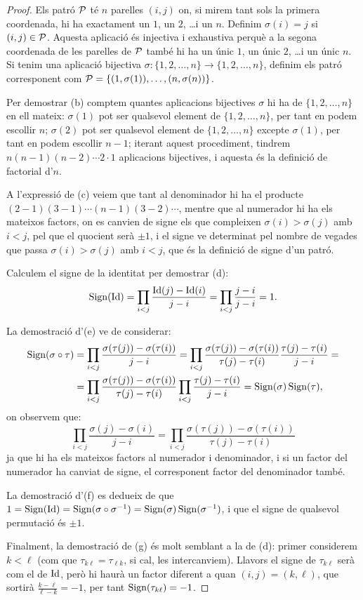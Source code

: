 \documentclass[
  11pt,
]{book}
\numberwithin{dummy}{section}
\theoremstyle{maincolornumbox}
\theoremstyle{blacknumex}
\theoremstyle{blacknumbox}
\theoremstyle{maincolornum}
\newlength\esp
\begin{document}
\begin{proof}
Els patró \(\mathcal{P}\) té \(n\) parelles \((i,j)\) on, si mirem tant
sols la primera coordenada, hi ha exactament un \(1\), un \(2\), \ldots i un
\(n\). Definim \(\sigma(i)=j\) si \((i,j)\in\mathcal{P}\). Aquesta aplicació és
injectiva i exhaustiva perquè a la segona coordenada de les parelles de
\(\mathcal{P}\) també hi ha un únic \(1\), un únic \(2\), \ldots i un únic \(n\).\\
Si tenim una aplicació bijectiva
\(\sigma\colon \{1,2,\dots,n\} \to \{1,2,\dots,n\}\), definim els patró
corresponent com \(\mathcal{P}=\{(1,\sigma(1)), \ldots, (n,\sigma(n))\}\).

Per demostrar (b) comptem quantes aplicacions bijectives \(\sigma\) hi ha
de \(\{1,2,\dots, n\}\) en ell mateix: \(\sigma(1)\) pot ser qualsevol
element de \(\{1,2,\dots, n\}\), per tant en podem escollir \(n\);
\(\sigma(2)\) pot ser qualsevol element de \(\{1,2,\dots, n\}\) excepte
\(\sigma(1)\), per tant en podem escollir \(n-1\); iterant aquest
procediment, tindrem \(n(n-1)(n-2) \cdots 2\cdot 1\) aplicacions
bijectives, i aquesta és la definició de factorial d'\(n\).

A l'expressió de (c) veiem que tant al denominador hi ha el producte
\((2-1)(3-1)\cdots (n-1)(3-2) \cdots\), mentre que al numerador hi ha els
mateixos factors, on es canvien de signe els que compleixen
\(\sigma(i)>\sigma(j)\) amb \(i<j\), pel que el quocient serà \(\pm 1\), i el
signe ve determinat pel nombre de vegades que passa
\(\sigma(i)>\sigma(j)\) amb \(i<j\), que és la definició de signe d'un
patró.

Calculem el signe de la identitat per demostrar (d):
\[\operatorname{Sign}(\operatorname{Id})=\prod_{i<j} \frac{\operatorname{Id}(j)-\operatorname{Id}(i)}{j-i}=\prod_{i<j} \frac{j-i}{j-i}=1 .\]

La demostració d'(e) ve de considerar: \begin{align*}
    \operatorname{Sign}(\sigma\circ\tau) & =\prod_{i<j} \frac{\sigma(\tau(j))-\sigma(\tau(i))}{j-i}  =
    \prod_{i<j} \frac{\sigma(\tau(j))-\sigma(\tau(i))}{\tau(j)-\tau(i)}\frac{\tau(j)-\tau(i)}{j-i}=\\
     & =\prod_{i<j} \frac{\sigma(\tau(j))-\sigma(\tau(i))}{\tau(j)-\tau(i)}\prod_{i<j}\frac{\tau(j)-\tau(i)}{j-i}= \operatorname{Sign}(\sigma)\operatorname{Sign}(\tau),
\end{align*} on observem que:
\[\prod_{i<j}\frac{\sigma(j)-\sigma(i)}{j-i}=\prod_{i<j} \frac{\sigma(\tau(j))-\sigma(\tau(i))}{\tau(j)-\tau(i)}\]
ja que hi ha els mateixos factors al numerador i denominador, i si un
factor del numerador ha canviat de signe, el corresponent factor del
denominador també.

La demostració d'(f) es dedueix de que
\(1=\operatorname{Sign}(\operatorname{Id})=\operatorname{Sign}(\sigma\circ \sigma^{-1})=\operatorname{Sign}(\sigma)\operatorname{Sign}(\sigma^{-1})\),
i que el signe de qualsevol permutació és \(\pm1\).

Finalment, la demostració de (g) és molt semblant a la de (d): primer
considerem \(k<\ell\) (com que \(\tau_{k\ell}=\tau_{\ell k}\), si cal, les
intercanviem). Llavors el signe de \(\tau_{k\ell}\) serà com el de \(\operatorname{Id}\),
però hi haurà un factor diferent a quan \((i,j)=(k,\ell)\), que sortirà
\(\frac{k-\ell}{\ell-k}=-1\), per tant \(\operatorname{Sign}(\tau_{k\ell})=-1\).
\end{proof}
\end{document}
